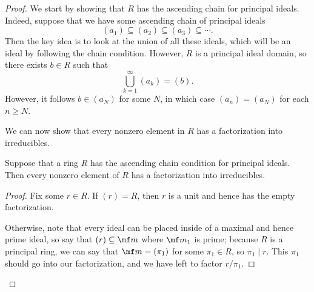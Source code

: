 \begin{proof}
	We start by showing that $R$ has the ascending chain for principal ideals. Indeed, suppose that we have some ascending chain of principal ideals
	\[(a_1)\subseteq (a_2)\subseteq(a_3)\subseteq\cdots.\]
	Then the key idea is to look at the union of all these ideals, which will be an ideal by following the chain condition. However, $R$ is a principal ideal domain, so there exists $b\in R$ such that
	\[\bigcup_{k=1}^\infty(a_k)=(b).\]
	However, it follows $b\in(a_N)$ for some $N$, in which case $(a_n)=(a_N)$ for each $n\ge N$.

	We can now show that every nonzero element in $R$ has a factorization into irreducibles.
	\begin{lemma}
		Suppose that a ring $R$ has the ascending chain condition for principal ideals. Then every nonzero element of $R$ has a factorization into irreducibles.
	\end{lemma}
	\begin{proof}
		Fix some $r\in R$. If $(r)=R$, then $r$ is a unit and hence has the empty factorization.
	
		Otherwise, note that every ideal can be placed inside of a maximal and hence prime ideal, so say that $(r)\subseteq\mf m$ where $\mf m_1$ is prime; because $R$ is a principal ring, we can say that $\mf m=(\pi_1)$ for some $\pi_1\in R$, so $\pi_1\mid r$. This $\pi_1$ should go into our factorization, and we have left to factor $r/\pi_1$.


\end{proof}
\end{proof}
